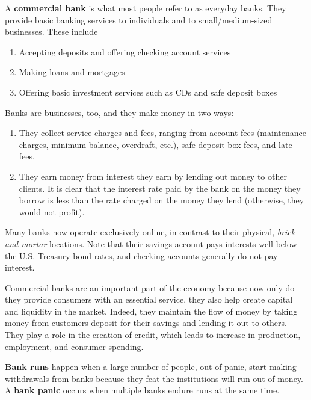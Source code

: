 \documentclass{article}
\begin{document}
      \begin{definition}
        A \textbf{commercial bank} is what most people refer to as everyday banks. They provide basic banking services to individuals and to small/medium-sized businesses. These include
        \begin{enumerate}
          \item Accepting deposits and offering checking account services
          \item Making loans and mortgages
          \item Offering basic investment services such as CDs and safe deposit boxes
        \end{enumerate}
        Banks are businesses, too, and they make money in two ways:
        \begin{enumerate}
          \item They collect service charges and fees, ranging from account fees (maintenance charges, minimum balance, overdraft, etc.), safe deposit box fees, and late fees. 
          \item They earn money from interest they earn by lending out money to other clients. It is clear that the interest rate paid by the bank on the money they borrow is less than the rate charged on the money they lend (otherwise, they would not profit). 
        \end{enumerate}
        Many banks now operate exclusively online, in contrast to their physical, \textit{brick-and-mortar} locations. Note that their savings account pays interests well below the U.S. Treasury bond rates, and checking accounts generally do not pay interest. 

        Commercial banks are an important part of the economy because now only do they provide consumers with an essential service, they also help create capital and liquidity in the market. Indeed, they maintain the flow of money by taking money from customers deposit for their savings and lending it out to others. They play a role in the creation of credit, which leads to increase in production, employment, and consumer spending. 
      \end{definition}

      \begin{definition}
        \textbf{Bank runs} happen when a large number of people, out of panic, start making withdrawals from banks because they feat the institutions will run out of money. A \textbf{bank panic} occurs when multiple banks endure runs at the same time. 
      \end{definition}
\end{document}
